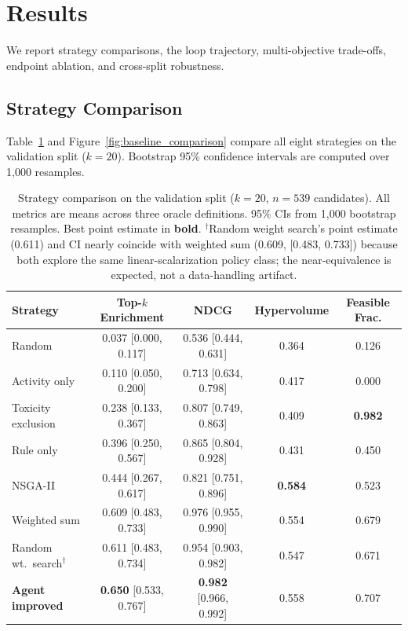\section{Results}
\label{sec:results}

We report strategy comparisons, the loop trajectory, multi-objective trade-offs, endpoint ablation, and cross-split robustness.

\subsection{Strategy Comparison}
\label{sec:strategy_comparison}

Table~\ref{tab:strategies} and Figure~\ref{fig:baseline_comparison} compare all eight strategies on the validation split ($k = 20$).
Bootstrap 95\% confidence intervals are computed over 1{,}000 resamples.

\begin{table}[t]
\centering
\caption{Strategy comparison on the validation split ($k = 20$, $n = 539$ candidates). All metrics are means across three oracle definitions. 95\% CIs from 1{,}000 bootstrap resamples. Best point estimate in \textbf{bold}. $^{\dagger}$Random weight search's point estimate (0.611) and CI nearly coincide with weighted sum (0.609, [0.483, 0.733]) because both explore the same linear-scalarization policy class; the near-equivalence is expected, not a data-handling artifact.}
\label{tab:strategies}
\small
\begin{tabular}{@{}lcccc@{}}
\toprule
\textbf{Strategy} & \textbf{Top-$k$ Enrichment} & \textbf{NDCG} & \textbf{Hypervolume} & \textbf{Feasible Frac.}  \\
\midrule
Random & 0.037 \scriptsize{[0.000, 0.117]} & 0.536 \scriptsize{[0.444, 0.631]} & 0.364 & 0.126 \\
Activity only & 0.110 \scriptsize{[0.050, 0.200]} & 0.713 \scriptsize{[0.634, 0.798]} & 0.417 & 0.000 \\
Toxicity exclusion & 0.238 \scriptsize{[0.133, 0.367]} & 0.807 \scriptsize{[0.749, 0.863]} & 0.409 & \textbf{0.982} \\
Rule only & 0.396 \scriptsize{[0.250, 0.567]} & 0.865 \scriptsize{[0.804, 0.928]} & 0.431 & 0.450 \\
NSGA-II & 0.444 \scriptsize{[0.267, 0.617]} & 0.821 \scriptsize{[0.751, 0.896]} & \textbf{0.584} & 0.523 \\
Weighted sum & 0.609 \scriptsize{[0.483, 0.733]} & 0.976 \scriptsize{[0.955, 0.990]} & 0.554 & 0.679 \\
Random wt.\ search$^{\dagger}$ & 0.611 \scriptsize{[0.483, 0.734]} & 0.954 \scriptsize{[0.903, 0.982]} & 0.547 & 0.671 \\
\textbf{Agent improved} & \textbf{0.650} \scriptsize{[0.533, 0.767]} & \textbf{0.982} \scriptsize{[0.966, 0.992]} & 0.558 & 0.707 \\
\bottomrule
\end{tabular}
\end{table}

